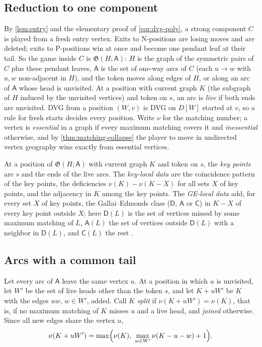 \documentclass[final]{siamart0516}
\numberwithin{theorem}{section}
\numberwithin{equation}{section}
\theoremstyle{siamnonum}
\theoremstyle{plain}
\newcommand{\game}{\mathfrak{G}}          %
\newcommand{\arcs}{\mathsf{A}}            %
\begin{document}
\subsection{Reduction to one component}\label{ssec:oneway-reduction}
By \cref{lem:entry} and the elementary proof of \cref{cor:dvg-poly}, a strong component $C$ is played from a fresh entry vertex. Exits to N-positions are losing moves and are deleted; exits to P-positions win at once and become one pendant leaf at their tail. So the game inside $C$ is $\game(H;\arcs)$: $H$ is the graph of the symmetric pairs of $C$ plus these pendant leaves, $\arcs$ is the set of one-way arcs of $C$ (each $u\to w$ with $u,w$ non-adjacent in $H$), and the token moves along edges of $H$, or along an arc of $\arcs$ whose head is unvisited. At a position with current graph $K$ (the subgraph of $H$ induced by the unvisited vertices) and token on $s$, an arc is \emph{live} if both ends are unvisited. DVG from a position $(W,v)$ is DVG on $D[W]$ started at $v$, so a rule for fresh starts decides every position. Write $\nu$ for the matching number; a vertex is \emph{essential} in a graph if every maximum matching covers it and \emph{inessential} otherwise, and by \cref{thm:matching-collapse} the player to move in undirected vertex geography wins exactly from essential vertices.

\begin{definition}\label{def:key-local}
At a position of $\game(H;\arcs)$ with current graph $K$ and token on $s$, the \emph{key points} are $s$ and the ends of the live arcs. The \emph{key-local data} are the coincidence pattern of the key points, the deficiencies $\nu(K)-\nu(K-X)$ for all sets $X$ of key points, and the adjacency in $K$ among the key points. The \emph{GE-local data} add, for every set $X$ of key points, the Gallai--Edmonds class ($\mathsf D$, $\mathsf A$ or $\mathsf C$) in $K-X$ of every key point outside $X$; here $\mathsf D(L)$ is the set of vertices missed by some maximum matching of $L$, $\mathsf A(L)$ the set of vertices outside $\mathsf D(L)$ with a neighbor in $\mathsf D(L)$, and $\mathsf C(L)$ the rest \cite{LovaszPlummer}.
\end{definition}

\subsection{Arcs with a common tail}

Let every arc of $\arcs$ leave the same vertex $u$. At a position in which $u$ is unvisited, let $W'$ be the set of live heads other than the token $s$, and let $K+uW'$ be $K$ with the edges $uw$, $w\in W'$, added. Call $K$ \emph{split} if $\nu(K+uW')=\nu(K)$, that is, if no maximum matching of $K$ misses $u$ and a live head, and \emph{joined} otherwise. Since all new edges share the vertex $u$,
\begin{equation}\label{eq:star-nu}
\nu(K+uW')=\max\Bigl(\nu(K),\ \max_{w\in W'}\nu(K-u-w)+1\Bigr).
\end{equation}
\end{document}
